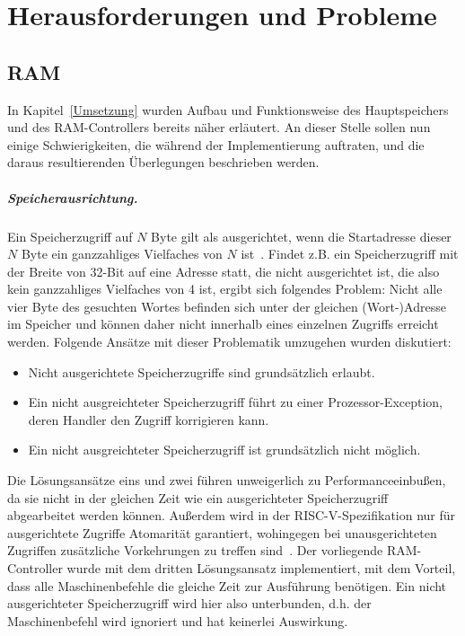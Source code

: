 \chapter{Herausforderungen und Probleme} %
\label{Probleme} %

\section{RAM}

In Kapitel~\ref{Umsetzung} wurden Aufbau und Funktionsweise des Hauptspeichers und des RAM-Controllers bereits näher erläutert.
An dieser Stelle sollen nun einige Schwierigkeiten, die während der Implementierung auftraten, und die daraus resultierenden Überlegungen beschrieben werden.

\paragraph{Speicherausrichtung.} 
Ein Speicherzugriff auf $N$ Byte gilt als ausgerichtet, wenn die Startadresse dieser $N$ Byte ein ganzzahliges Vielfaches von $N$ ist~\cite[S. 96/97]{Hennessy}.
Findet z.B. ein Speicherzugriff mit der Breite von 32-Bit auf eine Adresse statt, die nicht ausgerichtet ist, die also kein ganzzahliges Vielfaches von 4 ist, ergibt sich folgendes Problem:
Nicht alle vier Byte des gesuchten Wortes befinden sich unter der gleichen (Wort-)Adresse im Speicher und können daher nicht innerhalb eines einzelnen Zugriffs erreicht werden.
Folgende Ansätze mit dieser Problematik umzugehen wurden diskutiert:
\begin{itemize}
    \item Nicht ausgerichtete Speicherzugriffe sind grundsätzlich erlaubt.
    \item Ein nicht ausgreichteter Speicherzugriff führt zu einer Prozessor-Exception, deren Handler den Zugriff korrigieren kann.
    \item Ein nicht ausgreichteter Speicherzugriff ist grundsätzlich nicht möglich.
\end{itemize}

Die Lösungsansätze eins und zwei führen unweigerlich zu Performanceeinbußen, da sie nicht in der gleichen Zeit wie ein ausgerichteter Speicherzugriff abgearbeitet werden können.
Außerdem wird in der RISC-V-Spezifikation nur für ausgerichtete Zugriffe Atomarität garantiert, wohingegen bei unausgerichteten Zugriffen zusätzliche Vorkehrungen zu treffen sind~\cite[S. 18]{RISC}.
Der vorliegende RAM-Controller wurde mit dem dritten Lösungsansatz implementiert, mit dem Vorteil, dass alle Maschinenbefehle die gleiche Zeit zur Ausführung benötigen.
Ein nicht ausgerichteter Speicherzugriff wird hier also unterbunden, d.h. der Maschinenbefehl wird ignoriert und hat keinerlei Auswirkung.

